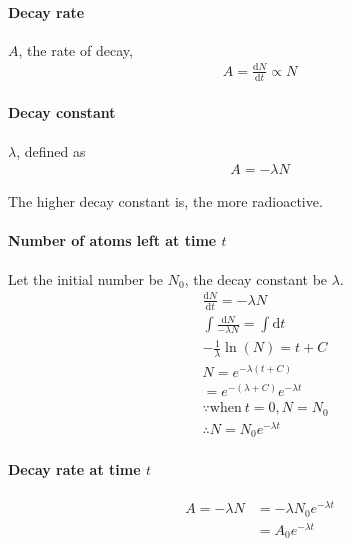         \paragraph{Decay rate}
            $A$, the rate of decay,
            \begin{align}
                A = \frac{\mathrm{d} N}{\mathrm{d} t} \propto N
            \end{align}

        \paragraph{Decay constant}
            $\lambda$, defined as
            \begin{align}
                A = - \lambda N
            \end{align}

            The higher decay constant is, the more radioactive.

        \paragraph{Number of atoms left at time $t$}
            Let the initial number be $N_0$, the decay constant be $\lambda$.
            \begin{align}
                & \frac{\mathrm{d} N}{\mathrm{d} t} = - \lambda N \\
                & \int \frac{\mathrm{d} N}{- \lambda N} = \int \mathrm{d} t  \\
                & -\frac{1}{\lambda} \ln(N) = t + C \\
                & N = e^{- \lambda (t + C)} \\
                &= e^{-(\lambda + C)} e^{- \lambda t} \\
                & \because \mathrm{when\ } t = 0, N = N_0 \\
                & \therefore N = N_0 e^{- \lambda t}
            \end{align}

        \paragraph{Decay rate at time $t$}
            \begin{align}
                A = -\lambda N &= - \lambda N_0 e^{- \lambda t} \\
                               &= A_0 e^{- \lambda t}
            \end{align}
        
